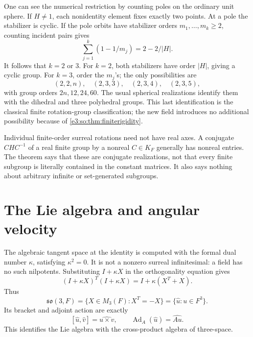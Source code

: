 \documentclass[11pt,letterpaper]{article}
\numberwithin{equation}{section}
\theoremstyle{definition}
\theoremstyle{remark}
\newcommand{\so}{\mathfrak{so}}
\newcommand{\Ad}{\operatorname{Ad}}
\newcommand{\abs}[1]{\left|#1\right|}
\begin{document}
One can see the numerical restriction by counting poles on the ordinary unit
sphere. If \(H\ne1\), each nonidentity element fixes exactly two points. At a
pole the stabilizer is cyclic. If the pole orbits have stabilizer orders
\(m_1,\ldots,m_k\ge2\), counting incident pairs gives
\begin{equation}\label{e3:so:eq:polecount}
 \sum_{j=1}^k(1-1/m_j)=2-2/\abs H.
\end{equation}
It follows that \(k=2\) or \(3\). For \(k=2\), both stabilizers have order
\(\abs H\), giving a cyclic group. For \(k=3\), order the \(m_j\)'s; the only
possibilities are
\[
 (2,2,n),\quad(2,3,3),\quad(2,3,4),\quad(2,3,5),
\]
with group orders \(2n,12,24,60\). The usual spherical realizations identify
them with the dihedral and three polyhedral groups. This last identification
is the classical finite rotation-group classification; the new field introduces
no additional possibility because of \cref{e3:so:thm:finiterigidity}.

Individual finite-order surreal rotations need not have real axes. A conjugate
\(C H C^{-1}\) of a real finite group by a nonreal \(C\in K_F\) generally has
nonreal entries. The theorem says that these are conjugate realizations, not
that every finite subgroup is literally contained in the constant matrices.
It also says nothing about arbitrary infinite or set-generated subgroups.

\section{The Lie algebra and angular velocity}\label{e3:so:sec:lie}

The algebraic tangent space at the identity is computed with the formal dual
number \(\kappa\), satisfying \(\kappa^2=0\). It is not a nonzero surreal
infinitesimal: a field has no such nilpotents. Substituting \(I+\kappa X\) in the
orthogonality equation gives
\[
 (I+\kappa X)^T(I+\kappa X)=I+\kappa(X^T+X).
\]
Thus
\begin{equation}\label{e3:so:eq:liealgebra}
 \so(3,F)=\{X\in M_3(F):X^T=-X\}
         =\{\widehat u:u\in F^3\}.
\end{equation}
Its bracket and adjoint action are exactly
\begin{equation}\label{e3:so:eq:liecross}
 [\widehat u,\widehat v]=\widehat{u\times v},\qquad
 \Ad_A(\widehat u)=\widehat{Au}.
\end{equation}
This identifies the Lie algebra with the cross-product algebra of three-space.
\end{document}

